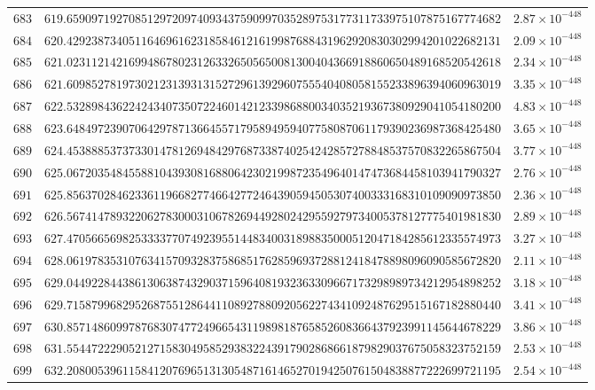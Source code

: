 \documentclass[12pt,reqno]{amsart}
\theoremstyle{remark}
\begin{document}
\begin{longtable}{clc}
$683$ & $619.6590971927085129720974093437590997035289753177311733975107875167774682$ & $2.87\times 10^{-448}$ \\
$684$ & $620.4292387340511646961623185846121619987688431962920830302994201022682131$ & $2.09\times 10^{-448}$ \\
$685$ & $621.0231121421699486780231263326505650081300404366918860650489168520542618$ & $2.34\times 10^{-448}$ \\
$686$ & $621.6098527819730212313931315272961392960755540408058155233896394060963019$ & $3.35\times 10^{-448}$ \\
$687$ & $622.5328984362242434073507224601421233986880034035219367380929041054180200$ & $4.83\times 10^{-448}$ \\
$688$ & $623.6484972390706429787136645571795894959407758087061179390236987368425480$ & $3.65\times 10^{-448}$ \\
$689$ & $624.4538885373733014781269484297687338740254242857278848537570832265867504$ & $3.77\times 10^{-448}$ \\
$690$ & $625.0672035484558810439308168806423021998723549640147473684458103941790327$ & $2.76\times 10^{-448}$ \\
$691$ & $625.8563702846233611966827746642772464390594505307400333168310109090973850$ & $2.36\times 10^{-448}$ \\
$692$ & $626.5674147893220627830003106782694492802429559279734005378127775401981830$ & $2.89\times 10^{-448}$ \\
$693$ & $627.4705665698253333770749239551448340031898835000512047184285612335574973$ & $3.27\times 10^{-448}$ \\
$694$ & $628.0619783531076341570932837586851762859693728812418478898096090585672820$ & $2.11\times 10^{-448}$ \\
$695$ & $629.0449228443861306387432903715964081932363309667173298989734212954898252$ & $3.18\times 10^{-448}$ \\
$696$ & $629.7158799682952687551286441108927880920562274341092487629515167182880440$ & $3.41\times 10^{-448}$ \\
$697$ & $630.8571486099787683074772496654311989818765852608366437923991145644678229$ & $3.86\times 10^{-448}$ \\
$698$ & $631.5544722290521271583049585293832243917902868661879829037675058323752159$ & $2.53\times 10^{-448}$ \\
$699$ & $632.2080053961158412076965131305487161465270194250761504838877222699721195$ & $2.54\times 10^{-448}$ \\

\end{longtable}
\end{document}
